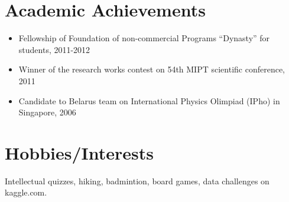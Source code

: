 \documentclass[a4paper,10pt]{article}
\begin{document}
\section*{Academic Achievements} 
\begin{itemize}
\item Fellowship of Foundation of non-commercial Programs “Dynasty” for students, 2011-2012
\item Winner of the research works contest on 54th MIPT scientific conference, 2011
\item Candidate to Belarus team on International Physics Olimpiad (IPho) in Singapore, 2006
\end{itemize}


\section*{Hobbies/Interests} 

Intellectual quizzes, hiking, badmintion, board games, data challenges on kaggle.com.







\end{document}
